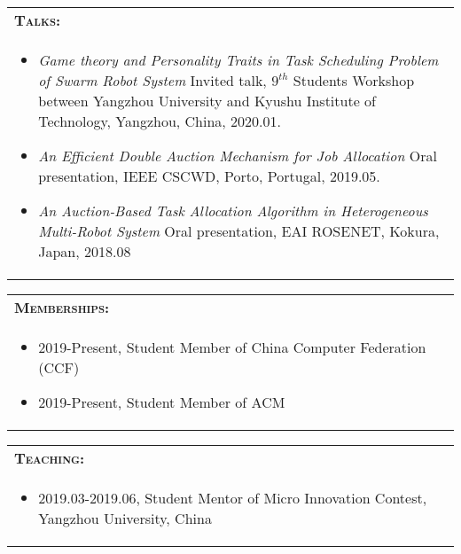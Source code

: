\documentclass{resume}
\begin{document}
      \vspace{-0.4cm}

\begin{tabular*}{15.2cm}{l@{\extracolsep{\fill}}}
  \textsc{\textbf{Talks:}}\\
  \multicolumn{1}{p{15.4cm}}{
    \vspace{-0.2cm}
  \begin{itemize}
    \item \emph{Game theory and Personality Traits in Task Scheduling Problem of Swarm Robot System} \newline
  Invited talk, $9^{th}$ Students Workshop between Yangzhou University and Kyushu Institute of Technology, Yangzhou, China, 2020.01.
  \item \emph{An Efficient Double Auction Mechanism for Job Allocation} \newline Oral presentation, IEEE CSCWD, Porto, Portugal, 2019.05.
  \item \emph{An Auction-Based Task Allocation Algorithm in Heterogeneous Multi-Robot System} \newline Oral presentation, EAI ROSENET, Kokura, Japan, 2018.08
      \end{itemize}}
  \end{tabular*}

  \vspace{-0.4cm}

\begin{tabular*}{15.2cm}{l@{\extracolsep{\fill}}}
    \textsc{\textbf{Memberships:}}\\
    \multicolumn{1}{p{15.4cm}}{
    \vspace{-0.2cm}
    \begin{itemize}
      \item 2019-Present, Student Member of China Computer Federation (CCF)
  \item 2019-Present, Student Member of ACM
        \end{itemize}}
\end{tabular*}

\vspace{-0.4cm}
\begin{tabular*}{15.2cm}{l@{\extracolsep{\fill}}}
  \textsc{\textbf{Teaching:}}\\
  \multicolumn{1}{p{15.4cm}}{
  \vspace{-0.2cm}
  \begin{itemize}
    \item 2019.03-2019.06, Student Mentor of Micro Innovation Contest, Yangzhou University, China
      \end{itemize}}
\end{tabular*}

\end{document}
